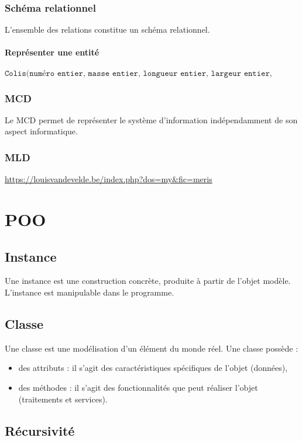 \documentclass{article}
\begin{document}
\subsubsection{Schéma relationnel}
L’ensemble des relations constitue un schéma relationnel.

\paragraph{Représenter une entité}
\[
\texttt{Colis(numéro entier, masse entier, longueur entier, largeur entier, hauteur entier, statut caractères)}
\]

\subsubsection{MCD}
Le MCD permet de représenter le système d'information indépendamment de son aspect informatique.

\subsubsection{MLD}
\url{https://louisvandevelde.be/index.php?dos=my&fic=meris}

\section{POO}

\subsection{Instance}
Une instance est une construction concrète, produite à partir de l’objet modèle. L’instance est manipulable dans le programme.

\subsection{Classe}
Une classe est une modélisation d’un élément du monde réel.  
Une classe possède :
\begin{itemize}
  \item des attributs : il s’agit des caractéristiques spécifiques de l’objet (données),
  \item des méthodes : il s’agit des fonctionnalités que peut réaliser l’objet (traitements et services).
\end{itemize}

\subsection{Récursivité}
\end{document}

